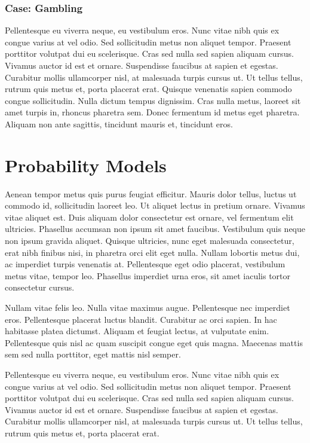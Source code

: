 \documentclass[11pt,letterpaper]{book}
\begin{document}
\subsubsection{Case: Gambling}
\noindent Pellentesque eu viverra neque, eu vestibulum eros. Nunc vitae nibh quis ex congue varius at vel odio. Sed sollicitudin metus non aliquet tempor. Praesent porttitor volutpat dui eu scelerisque. Cras sed nulla sed sapien aliquam cursus. Vivamus auctor id est et ornare. Suspendisse faucibus at sapien et egestas. Curabitur mollis ullamcorper nisl, at malesuada turpis cursus ut. Ut tellus tellus, rutrum quis metus et, porta placerat erat. Quisque venenatis sapien commodo congue sollicitudin. Nulla dictum tempus dignissim. Cras nulla metus, laoreet sit amet turpis in, rhoncus pharetra sem. Donec fermentum id metus eget pharetra. Aliquam non ante sagittis, tincidunt mauris et, tincidunt eros. 

\section{Probability Models}
\noindent  Aenean tempor metus quis purus feugiat efficitur. Mauris dolor tellus, luctus ut commodo id, sollicitudin laoreet leo. Ut aliquet lectus in pretium ornare. Vivamus vitae aliquet est. Duis aliquam dolor consectetur est ornare, vel fermentum elit ultricies. Phasellus accumsan non ipsum sit amet faucibus. Vestibulum quis neque non ipsum gravida aliquet. Quisque ultricies, nunc eget malesuada consectetur, erat nibh finibus nisi, in pharetra orci elit eget nulla. Nullam lobortis metus dui, ac imperdiet turpis venenatis at. Pellentesque eget odio placerat, vestibulum metus vitae, tempor leo. Phasellus imperdiet urna eros, sit amet iaculis tortor consectetur cursus.

Nullam vitae felis leo. Nulla vitae maximus augue. Pellentesque nec imperdiet eros. Pellentesque placerat luctus blandit. Curabitur ac orci sapien. In hac habitasse platea dictumst. Aliquam et feugiat lectus, at vulputate enim. Pellentesque quis nisl ac quam suscipit congue eget quis magna. Maecenas mattis sem sed nulla porttitor, eget mattis nisl semper.

Pellentesque eu viverra neque, eu vestibulum eros. Nunc vitae nibh quis ex congue varius at vel odio. Sed sollicitudin metus non aliquet tempor. Praesent porttitor volutpat dui eu scelerisque. Cras sed nulla sed sapien aliquam cursus. Vivamus auctor id est et ornare. Suspendisse faucibus at sapien et egestas. Curabitur mollis ullamcorper nisl, at malesuada turpis cursus ut. Ut tellus tellus, rutrum quis metus et, porta placerat erat.
\end{document}
